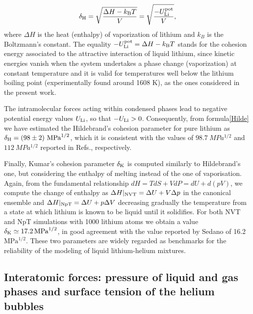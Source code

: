 \documentclass[jcp,amsmath,amssymb,preprint]{revtex4-1}
\begin{document}
\begin{equation}  \label{Hilde}
\delta_{\rm H} = \sqrt{\frac{\Delta H - k_{\rm B}T}{V}} = \sqrt{\frac{-U_{\rm Li}^{\rm pot}}{V}},
\end{equation}
where $\Delta H$ is the heat (enthalpy) of vaporization of lithium and $k_B$ is the Boltzmann's constant.  The equality 
$-U_{\rm Li}^{\rm pot} = \Delta H - k_{\rm B}T$ stands for the cohesion energy associated to the attractive interaction 
of liquid lithium,  since kinetic energies vanish when the system undertakes a phase change (vaporization) at constant temperature and it is valid for temperatures well below the lithium boiling point (experimentally found around 1608 K\cite{davison1968compilation}), as the ones considered in the present work. 

The intramolecular forces acting within condensed phases lead to negative potential energy values $U_{\rm Li}$, so that $-U_{\rm Li}>0$.  Consequently,  from formula\ref{Hilde} we have estimated the Hildebrand's cohesion parameter for pure lithium as $\delta_{\rm H} = (98 \pm 2) \text{ MPa}^{1/2}$,  which it is consistent with the values of $\SI{98.7}{MPa^{1/2}}$ and $\SI{112}{MPa^{1/2}}$ reported in Refs.\cite{sedano2022solubility,barton2017crc}, respectively.  

Finally,  Kumar's cohesion parameter $\delta_{\rm K}$ is computed similarly to Hildebrand's one,  but considering the enthalpy of melting instead of the one of vaporisation\cite{sedano2022solubility}.  Again,  from the fundamental relationship $\displaystyle dH = T dS + V dP = dU + d(pV)$, we compute the change of enthalpy as $\Delta H|_{\rm NVT} = \Delta U + V \Delta p$ in the canonical ensemble and $\Delta H|_{\rm NpT} = \Delta U + p \Delta V$ decreasing gradually the temperature from a state at which lithium is known to be liquid until it solidifies.  For both NVT and NpT simulations with 1000 lithium atoms we obtain a value  $\delta_{\rm K} \simeq \SI{17.2}{MPa^{1/2}}$, in good agreement with the value reported by Sedano\cite{sedano2007helium} of 16.2 $\text{MPa}^{1/2}$. These two parameters are widely regarded as benchmarks for the reliability of the modeling of liquid lithium-helium mixtures\cite{sedano2022solubility}.  
         
\subsection{\label{forces} Interatomic forces: pressure of liquid and gas phases and surface tension of the helium bubbles}
\end{document}
